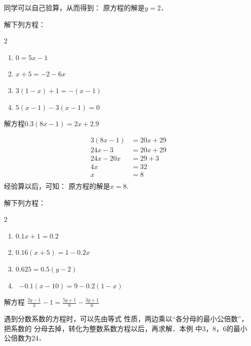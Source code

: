 同学可以自己验算，从而得到： 原方程的解是$y=2$．


\begin{ex}
解下列方程： 
\begin{multicols}{2}
    \begin{enumerate}
\item \quad$0=5x-1$
\item   \quad$x+5=-2-6x$
\item \quad$3(1-x)+1=-(x-1)$      
\item \quad$5(x-1)-3(x-1)=0$
    \end{enumerate}
\end{multicols}
\end{ex}

\begin{example}
    解方程$0.3(8x-1)=2x+2.9$
\end{example}

\begin{solution}
\begin{align*}
    3 (8x-1)&=20x+29  \tag{原方程两边乘以10}\\
    24x-3&=20x+29   \tag{去括号}\\
    24x-20x&=29+3\tag{移项变号}\\
    4x &= 32\tag{合并同类项}\\
    x&=8\tag{两边除以4}\\
\end{align*}
经验算以后，可知：
原方程的解是$x=8$.    
\end{solution}

\begin{ex}
解下列方程：
\begin{multicols}{2}
\begin{enumerate}
    \item \quad$0.1x+1=0.2$
    \item \quad$0.16(x+5)=1-0.2x$
    \item \quad$0.625=0.5(y-2)$
    \item \ $-0.1(x-10)=9-0.2(1-x)$
\end{enumerate}
\end{multicols}
\end{ex}

\begin{example}
  解方程
$\frac{2y-1}{3}-1=\frac{5y+1}{8}-\frac{3y+1}{6}$
\end{example}

\begin{analyze}
   遇到分数系数的方程时，可以先由等式
    性质，两边乘以“各分母的最小公倍数”，把系数的
    分母去掉，转化为整数系数方程以后，再求解．本例
    中3，8，6的最小公倍数为24．
\end{analyze}

